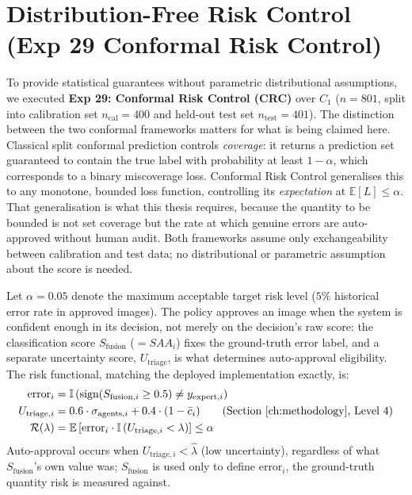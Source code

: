 \documentclass[12pt,a4paper]{report}
\begin{document}
\section{Distribution-Free Risk Control (Exp 29 Conformal Risk Control)}
To provide statistical guarantees without parametric distributional assumptions, we executed \textbf{Exp 29: Conformal Risk Control (CRC)} \cite{crc2024} over $C_1$ ($n=801$, split into calibration set $n_{\text{cal}}=400$ and held-out test set $n_{\text{test}}=401$). The distinction between the two conformal frameworks matters for what is being claimed here. Classical split conformal prediction \cite{vovk2005algorithmic,angelopoulos2024conformal} controls \emph{coverage}: it returns a prediction set guaranteed to contain the true label with probability at least $1-\alpha$, which corresponds to a binary miscoverage loss. Conformal Risk Control \cite{crc2024} generalises this to any monotone, bounded loss function, controlling its \emph{expectation} at $\mathbb{E}[L] \le \alpha$. That generalisation is what this thesis requires, because the quantity to be bounded is not set coverage but the rate at which genuine errors are auto-approved without human audit. Both frameworks assume only exchangeability between calibration and test data; no distributional or parametric assumption about the score is needed.

Let $\alpha = 0.05$ denote the maximum acceptable target risk level ($5\%$ historical error rate in approved images). The policy approves an image when the system is confident enough in its decision, not merely on the decision's raw score: the classification score $S_{\text{fusion}}$ ($=SAA_i$) fixes the ground-truth error label, and a separate uncertainty score, $U_{\text{triage}}$, is what determines auto-approval eligibility. The risk functional, matching the deployed implementation exactly, is:
\begin{align}
    \text{error}_i &= \mathbb{I}\left(\text{sign}(S_{\text{fusion}, i} \ge 0.5) \neq y_{\text{expert}, i}\right) \\
    U_{\text{triage}, i} &= 0.6 \cdot \sigma_{\text{agents}, i} + 0.4 \cdot (1 - \bar{c}_i) \qquad \text{(Section~\ref{ch:methodology}, Level 4)} \\
    \mathcal{R}(\lambda) &= \mathbb{E}\left[ \text{error}_i \cdot \mathbb{I}\left(U_{\text{triage}, i} < \lambda\right) \right] \le \alpha
\end{align}
Auto-approval occurs when $U_{\text{triage}, i} < \hat\lambda$ (low uncertainty), regardless of what $S_{\text{fusion}}$'s own value was; $S_{\text{fusion}}$ is used only to define $\text{error}_i$, the ground-truth quantity risk is measured against.
\end{document}
